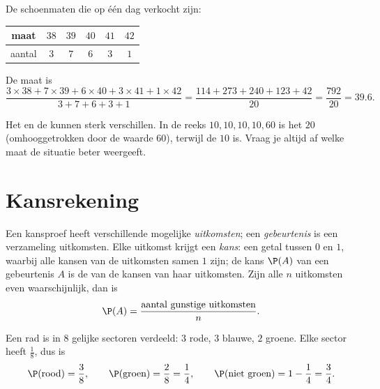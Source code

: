 \begin{example}\label{ex:g9:statproba:weighted}
De schoenmaten die op één dag verkocht zijn:
\begin{center}
\renewcommand{\arraystretch}{1.2}
\begin{tabular}{c|ccccc}
maat & $38$ & $39$ & $40$ & $41$ & $42$ \\
\hline
aantal & $3$ & $7$ & $6$ & $3$ & $1$ \\
\end{tabular}
\end{center}
De  maat is
\[
\frac{3 \times 38 + 7 \times 39 + 6 \times 40 + 3 \times 41 + 1 \times 42}
{3 + 7 + 6 + 3 + 1}
= \frac{114 + 273 + 240 + 123 + 42}{20}
= \frac{792}{20} = 39.6 .
\]
\end{example}

\begin{remark}
Het  en de  kunnen sterk verschillen. In de reeks
$10, 10, 10, 10, 60$ is het  $20$ (omhooggetrokken door de waarde $60$),
terwijl de  $10$ is. Vraag je altijd af welke maat de situatie beter
weergeeft.
\end{remark}

\section{Kansrekening}

\begin{definition}[Kans]\label{def:g9:statproba:probability}
Een kansproef heeft verschillende mogelijke \emph{uitkomsten}; een
\emph{gebeurtenis} is een verzameling uitkomsten. Elke uitkomst krijgt een
\emph{kans}: een getal tussen $0$ en $1$, waarbij alle kansen van de
uitkomsten samen $1$ zijn; de kans $\P(A)$ van een gebeurtenis $A$ is de  van de
kansen van haar uitkomsten. Zijn alle $n$ uitkomsten even waarschijnlijk, dan is
\[
\P(A) = \frac{\text{aantal gunstige uitkomsten}}{n}.
\]
\end{definition}

\begin{example}\label{ex:g9:statproba:spinner}
Een rad is in $8$ gelijke sectoren verdeeld: $3$ rode, $3$ blauwe, $2$ groene. Elke
sector heeft  $\frac18$, dus is
\[
\P(\text{rood}) = \frac38, \qquad
\P(\text{groen}) = \frac28 = \frac14, \qquad
\P(\text{niet groen}) = 1 - \frac14 = \frac34 .
\]
\end{example}

